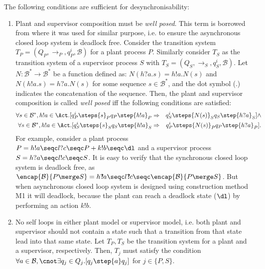\documentclass[a4paper,english,final]{article}
\theoremstyle{plain}
\theoremstyle{definition}
\newcommand{\com}{\ensuremath{?\mkern-6mu!}}
\newcommand{\block}{\ensuremath{\mathcal{B}}}
\begin{document}
The following conditions are sufficient for desynchronisability:
\begin{enumerate}
\item Plant and supervisor composition must be \textit{well posed}. This term is borrowed from \cite{balemiphdt} where it was used for similar purpose, i.e. to ensure the asynchronous closed loop system is deadlock free. Consider the transition system $T_P=(Q_P,\rightarrow_P,q^i_P,\block)$ for a plant process $P$. Similarly consider $T_S$ as the transition system of a supervisor process $S$ with $T_S=(Q_S,\rightarrow_S,q^i_S,\block)$. Let $N:\block^{*}\rightarrow\block^{*}$ be a function defined as: $N(h?a.s)=h!a.N(s)$ and $N(h!a.s)=h?a.N(s)$ for some sequence $s\in\block^{*}$, and the dot symbol (.) indicates the concatenation of the sequence. Then, the plant and supervisor composition is called \textit{well posed} iff the following conditions are satisfied:
\begin{eqnarray*}
\forall s\in\block^{*},h!a\in\Act.[q^i_P\steps{s}_P q_P\step{h!a}_P&\Rightarrow& q^i_S\steps{N(s)}_S q_S\step{h? a}_S] \wedge \\
\forall s\in\block^{*},h!a\in\Act.[q^i_S\steps{s}_S q_S\step{h!a}_S&\Rightarrow& q^i_P\steps{N(s)}_P q_P\step{h?a}_P].
\end{eqnarray*}
For example, consider a plant process $P=h!a\seqc l?c\seqc P+k!b\seqc\dl$ and a supervisor process $S=h?a\seqc l!c\seqc S$. It is easy to verify that the synchronous closed loop system is deadlock free, as $\encap{\block}{P\merge S}=h\com a\seqc l\com c\seqc \encap{\block}{P\merge S}$. But when asynchronous closed loop system is designed using construction method M1 it will deadlock, because the plant can reach a deadlock state ($\dl$) by performing an action $k!b$.
\item No self loops in either plant model or supervisor model, i.e. both plant and supervisor should not contain a state such that a transition from that state lead into that same state. Let $T_P,T_S$ be the transition system for a plant and a supervisor, respectively. Then, $T_j$ must satisfy the condition $\forall a\in\block,\cnot\exists q_j\in Q_j.[q_j\step{a}q_j]$ for $j\in\{P,S\}$.


\end{enumerate}
\end{document}
